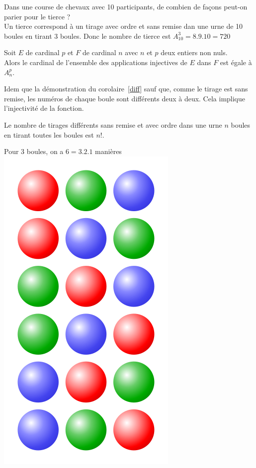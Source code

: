 \documentclass{book}
\begin{document}
\begin{Exemple} Dans une course de chevaux avec 10 participants, de combien de
façons peut-on parier pour le tierce ? \\
Un tierce correspond à un tirage avec ordre et sans remise dan une urne de 10 boules en tirant 3 boules. Donc le nombre de tierce est $A^3_{10}=8.9.10=720$
\end{Exemple}
\begin{Corollaire}
Soit $E$ de cardinal $p$ et $F$ de cardinal $n$ avec  $n$ et $p$ deux entiers non nuls. \\
Alors le cardinal de l'ensemble des applications injectives de $E$ dans $F$  est égale à  $A^p_n$.
\end{Corollaire}
\begin{Demonstration}Idem que la démonstration du corolaire~\ref{diff} sauf que, comme le tirage est sans remise, les numéros de chaque boule sont différents deux à deux. Cela implique l'injectivité de la fonction.
\end{Demonstration}
\begin{Corollaire}[$n=p$]Le nombre de tirages différents sans remise et avec ordre dans une urne $n$ boules en tirant toutes les boules est $n!$.
\end{Corollaire}
\begin{Exemple}Pour 3 boules, on a $6=3.2.1$ manières \includegraphics[scale=0.1]{permutation_bille.png}
\end{Exemple}
\end{document}
